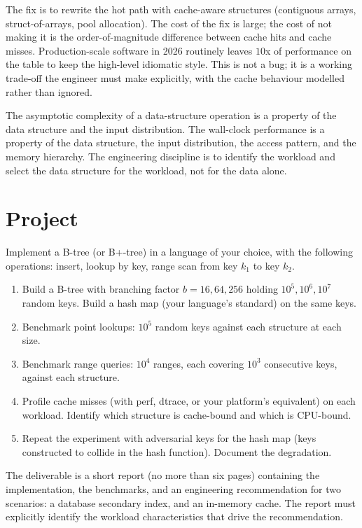 The fix is to rewrite the hot path with cache-aware structures (contiguous arrays, struct-of-arrays, pool allocation). The cost of the fix is large; the cost of not making it is the order-of-magnitude difference between cache hits and cache misses. Production-scale software in 2026 routinely leaves $10$x of performance on the table to keep the high-level idiomatic style. This is not a bug; it is a working trade-off the engineer must make explicitly, with the cache behaviour modelled rather than ignored.

\begin{principle}
The asymptotic complexity of a data-structure operation is a property of the data structure and the input distribution. The wall-clock performance is a property of the data structure, the input distribution, the access pattern, and the memory hierarchy. The engineering discipline is to identify the workload and select the data structure for the workload, not for the data alone.
\end{principle}

\section{Project}

\begin{project}
Implement a B-tree (or B+-tree) in a language of your choice, with the following operations: insert, lookup by key, range scan from key $k_1$ to key $k_2$.

\begin{enumerate}[leftmargin=*]
  \item Build a B-tree with branching factor $b = 16, 64, 256$ holding $10^5, 10^6, 10^7$ random keys. Build a hash map (your language's standard) on the same keys.
  \item Benchmark point lookups: $10^5$ random keys against each structure at each size.
  \item Benchmark range queries: $10^4$ ranges, each covering $10^3$ consecutive keys, against each structure.
  \item Profile cache misses (with perf, dtrace, or your platform's equivalent) on each workload. Identify which structure is cache-bound and which is CPU-bound.
  \item Repeat the experiment with adversarial keys for the hash map (keys constructed to collide in the hash function). Document the degradation.
\end{enumerate}

The deliverable is a short report (no more than six pages) containing the implementation, the benchmarks, and an engineering recommendation for two scenarios: a database secondary index, and an in-memory cache. The report must explicitly identify the workload characteristics that drive the recommendation.
\end{project}

